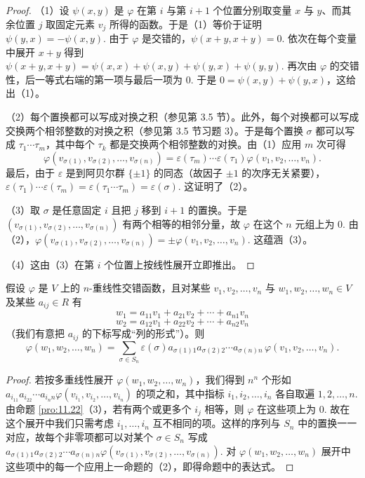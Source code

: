 \begin{proof}
（1）设 \(\psi(x, y)\) 是 \(\varphi\) 在第 \(i\) 与第 \(i+1\) 个位置分别取变量 \(x\) 与 \(y\)、而其余位置 \(j\) 取固定元素 \(v_j\) 所得的函数。于是（1）等价于证明 \(\psi(y, x) = -\psi(x, y)\). 由于 \(\varphi\) 是交错的，\(\psi(x+y, x+y) = 0\). 依次在每个变量中展开 \(x+y\) 得到 \(\psi(x+y, x+y) = \psi(x, x)+\psi(x, y)+\psi(y, x)+\psi(y, y)\). 再次由 \(\varphi\) 的交错性，后一等式右端的第一项与最后一项为 0. 于是 \(0 = \psi(x, y)+\psi(y, x)\)，这给出（1）。

（2）每个置换都可以写成对换之积（参见第 3.5 节）。此外，每个对换都可以写成交换两个相邻整数的对换之积（参见第 3.5 节习题 3）。于是每个置换 \(\sigma\) 都可以写成 \(\tau_1\cdots\tau_m\)，其中每个 \(\tau_k\) 都是交换两个相邻整数的对换。由（1）应用 \(m\) 次可得
\[
\varphi(v_{\sigma(1)}, v_{\sigma(2)}, \ldots, v_{\sigma(n)}) = \varepsilon(\tau_m)\cdots\varepsilon(\tau_1)\varphi(v_1, v_2, \ldots, v_n).
\]
最后，由于 \(\varepsilon\) 是到阿贝尔群 \(\{\pm 1\}\) 的同态（故因子 \(\pm 1\) 的次序无关紧要），\(\varepsilon(\tau_1)\cdots\varepsilon(\tau_m) = \varepsilon(\tau_1\cdots\tau_m) = \varepsilon(\sigma)\). 这证明了（2）。

（3）取 \(\sigma\) 是任意固定 \(i\) 且把 \(j\) 移到 \(i+1\) 的置换。于是 \((v_{\sigma(1)}, v_{\sigma(2)}, \ldots, v_{\sigma(n)})\) 有两个相等的相邻分量，故 \(\varphi\) 在这个 \(n\) 元组上为 0. 由（2），\(\varphi(v_{\sigma(1)}, v_{\sigma(2)}, \ldots, v_{\sigma(n)}) = \pm\varphi(v_1, v_2, \ldots, v_n)\). 这蕴涵（3）。

（4）这由（3）在第 \(i\) 个位置上按线性展开立即推出。
\end{proof}

\begin{proposition}\label{pro:11.23}
假设 \(\varphi\) 是 \(V\) 上的 \(n\)-重线性交错函数，且对某些 \(v_1, v_2, \ldots, v_n\) 与 \(w_1, w_2, \ldots, w_n \in V\) 及某些 \(a_{ij} \in R\) 有
\[
w_1 = a_{11}v_1+a_{21}v_2+\cdots+a_{n1}v_n
\]
\[
w_2 = a_{12}v_1+a_{22}v_2+\cdots+a_{n2}v_n
\]
（我们有意把 \(a_{ij}\) 的下标写成“列的形式”）。则
\[
\varphi(w_1, w_2, \ldots, w_n) = \sum_{\sigma \in S_n} \varepsilon(\sigma)a_{\sigma(1)1}a_{\sigma(2)2}\cdots a_{\sigma(n)n}\,\varphi(v_1, v_2, \ldots, v_n).
\]
\end{proposition}

\begin{proof}
若按多重线性展开 \(\varphi(w_1, w_2, \ldots, w_n)\)，我们得到 \(n^n\) 个形如 \(a_{i_11}a_{i_22}\cdots a_{i_nn}\varphi(v_{i_1}, v_{i_2}, \ldots, v_{i_n})\) 的项之和，其中指标 \(i_1, i_2, \ldots, i_n\) 各自取遍 \(1, 2, \ldots, n\). 由命题 \ref{pro:11.22}（3），若有两个或更多个 \(i_j\) 相等，则 \(\varphi\) 在这些项上为 0. 故在这个展开中我们只需考虑 \(i_1, \ldots, i_n\) 互不相同的项。这样的序列与 \(S_n\) 中的置换一一对应，故每个非零项都可以对某个 \(\sigma \in S_n\) 写成 \(a_{\sigma(1)1}a_{\sigma(2)2}\cdots a_{\sigma(n)n}\varphi(v_{\sigma(1)}, v_{\sigma(2)}, \ldots, v_{\sigma(n)})\). 对 \(\varphi(w_1, w_2, \ldots, w_n)\) 展开中这些项中的每一个应用上一命题的（2），即得命题中的表达式。
\end{proof}

